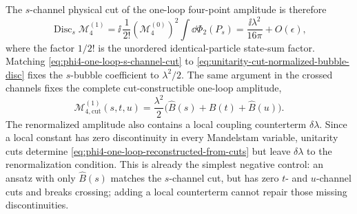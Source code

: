 The \(s\)-channel physical cut of the one-loop four-point amplitude is
therefore
\begin{equation}
  \operatorname{Disc}_s\mathcal M_4^{(1)}
  =
  \ii\,
  \frac1{2!}
  (\mathcal M_4^{(0)})^2
  \int\dd\Phi_2(P_s)
  =
  \frac{\ii\lambda^2}{16\pi}+O(\epsilon),
  \label{eq:phi4-one-loop-s-channel-cut}
\end{equation}
where the factor \(1/2!\) is the unordered identical-particle state-sum
factor.  Matching \eqref{eq:phi4-one-loop-s-channel-cut} to
\eqref{eq:unitarity-cut-normalized-bubble-disc} fixes the \(s\)-bubble
coefficient to \(\lambda^2/2\).  The same argument in the crossed channels
fixes the complete cut-constructible one-loop amplitude,
\begin{equation}
  \mathcal M_{4,\mathrm{cut}}^{(1)}(s,t,u)
  =
  \frac{\lambda^2}{2}
  \bigl(\widehat B(s)+\widehat B(t)+\widehat B(u)\bigr).
  \label{eq:phi4-one-loop-reconstructed-from-cuts}
\end{equation}
The renormalized amplitude also contains a local coupling counterterm
\(\delta\lambda\).  Since a local constant has zero discontinuity in every
Mandelstam variable, unitarity cuts determine
\eqref{eq:phi4-one-loop-reconstructed-from-cuts} but leave
\(\delta\lambda\) to the renormalization condition.  This is already the
simplest negative control: an ansatz with only \(\widehat B(s)\) matches the
\(s\)-channel cut, but has zero \(t\)- and \(u\)-channel cuts and breaks
crossing; adding a local counterterm cannot repair those missing
discontinuities.

